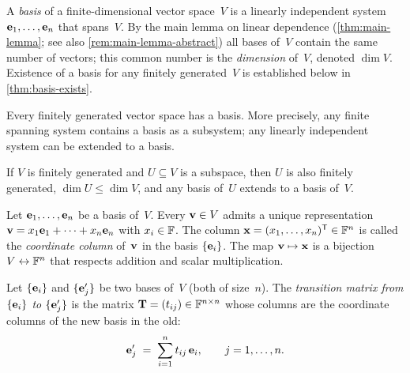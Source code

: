 \begin{definition}
\label{def:basis-dim}
A \emph{basis} of a finite-dimensional vector space~$V$ is a
linearly independent system $\mathbf{e}_1, \dots, \mathbf{e}_n$ that
spans~$V$. By the main lemma on linear dependence
(\cref{thm:main-lemma}; see also \cref{rem:main-lemma-abstract})
all bases of~$V$ contain the same number of vectors; this common
number is the \emph{dimension} of~$V$, denoted $\dim V$. Existence of
a basis for any finitely generated~$V$ is established below in
\cref{thm:basis-exists}.
\end{definition}

\begin{theorem}
\label{thm:basis-exists}
Every finitely generated vector space has a basis. More precisely, any
finite spanning system contains a basis as a subsystem; any linearly
independent system can be extended to a basis.
\end{theorem}

\begin{corollary}
\label{cor:subspace-fg}
If $V$ is finitely generated and $U \subseteq V$ is a subspace, then
$U$ is also finitely generated, $\dim U \le \dim V$, and any basis
of~$U$ extends to a basis of~$V$.
\end{corollary}

\begin{theorem}
\label{thm:coordinates}
Let $\mathbf{e}_1, \dots, \mathbf{e}_n$ be a basis of~$V$. Every $\mathbf{v} \in V$
admits a unique representation
$\mathbf{v} = x_1 \mathbf{e}_1 + \dots + x_n \mathbf{e}_n$ with $x_i \in \mathbb{F}$.
The column $\mathbf{x} = (x_1, \dots, x_n)^{\mathsf{T}} \in \mathbb{F}^n$ is called the
\emph{coordinate column} of~$\mathbf{v}$ in the basis
$\{\mathbf{e}_i\}$. The map $\mathbf{v} \mapsto \mathbf{x}$ is a bijection
$V \leftrightarrow \mathbb{F}^n$ that respects addition and scalar
multiplication.
\end{theorem}

\begin{definition}
\label{def:transition-matrix}
Let $\{\mathbf{e}_i\}$ and $\{\mathbf{e}'_j\}$ be two bases of~$V$
(both of size~$n$). The \emph{transition matrix from
$\{\mathbf{e}_i\}$ to $\{\mathbf{e}'_j\}$} is the matrix
$\mathbf{T} = (t_{ij}) \in \mathbb{F}^{n \times n}$ whose columns are the
coordinate columns of the new basis in the old:
\[
  \mathbf{e}'_j \;=\; \sum_{i=1}^{n} t_{ij}\,\mathbf{e}_i,
  \qquad j = 1, \dots, n.
\]
\end{definition}

